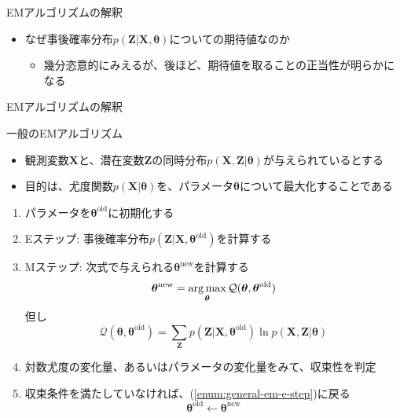 \documentclass[dvipdfmx,notheorems,t]{beamer}
\begin{document}
\begin{frame}{EMアルゴリズムの解釈}
\begin{itemize}
	\item なぜ事後確率分布$p(\bm{Z} | \bm{X}, \bm{\theta})$についての期待値なのか
	\begin{itemize}
		\item 幾分恣意的にみえるが、後ほど、期待値を取ることの正当性が明らかになる
	\end{itemize}
\end{itemize}

\end{frame}

\begin{frame}{EMアルゴリズムの解釈}

\begin{block}{一般のEMアルゴリズム}
	\begin{itemize}
		\item 観測変数$\bm{X}$と、潜在変数$\bm{Z}$の同時分布$p(\bm{X}, \bm{Z} | \bm{\theta})$が与えられているとする
		\item 目的は、尤度関数$p(\bm{X} | \bm{\theta})$を、パラメータ$\bm{\theta}$について最大化することである
	\end{itemize}
\end{block}

\begin{enumerate}
	\item パラメータを$\bm{\theta}^\mathrm{old}$に初期化する
	\item \alert{Eステップ}: 事後確率分布$p(\bm{Z} | \bm{X}, \bm{\theta}^\mathrm{old})$を計算する \label{enum:general-em-e-step}
	\newline
	\item \alert{Mステップ}: 次式で与えられる$\bm{\theta}^\mathrm{new}$を計算する
	\begin{equation}
		\bm{\theta}^\mathrm{new} = \operatorname*{arg\,max}_{\bm{\theta}} \mathcal{Q}(\bm{\theta}, \bm{\theta}^\mathrm{old})
	\end{equation}
	但し
	\begin{equation}
		\mathcal{Q}(\bm{\theta}, \bm{\theta}^\mathrm{old}) = \sum_{\bm{Z}} p(\bm{Z} | \bm{X}, \bm{\theta}^\mathrm{old}) \ln p(\bm{X}, \bm{Z} | \bm{\theta})
	\end{equation}
	
	\item 対数尤度の変化量、あるいはパラメータの変化量をみて、収束性を判定
	\item 収束条件を満たしていなければ、(\ref{enum:general-em-e-step})に戻る
	\begin{equation}
		\bm{\theta}^\mathrm{old} \leftarrow \bm{\theta}^\mathrm{new}
	\end{equation}
\end{enumerate}

\end{frame}
\end{document}
